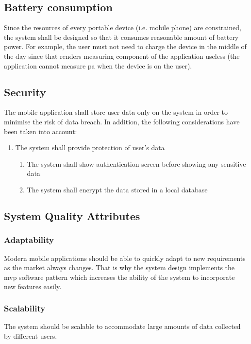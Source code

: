     \subsection{Battery consumption}
    Since the resources of every portable device (i.e. mobile phone) are constrained, the system shall be designed so that it consumes reasonable amount of battery power. For example, the user must not need to charge the device in the middle of the day since that renders measuring component of the application useless (the application cannot measure \gls{pa} when the device is on the user).
    
    \subsection{Security}
    The mobile application shall store user data only on the system in order to minimise the risk of data breach. In addition, the following considerations have been taken into account:
    
    \begin{enumerate}
        \item The system shall provide protection of user's data
            \begin{enumerate}
                \item The system shall show authentication screen before showing any sensitive data
                \item The system shall encrypt the data stored in a local database
            \end{enumerate}
    \end{enumerate}
    
    \subsection{System Quality Attributes}
        
        \subsubsection{Adaptability}
        Modern mobile applications should be able to quickly adapt to new requirements as the market always changes. That is why the system design implements the \gls{mvp} software pattern which increases the ability of the system to incorporate new features easily.
        
        \subsubsection{Scalability}
        The system should be scalable to accommodate large amounts of data collected by different users.
        
